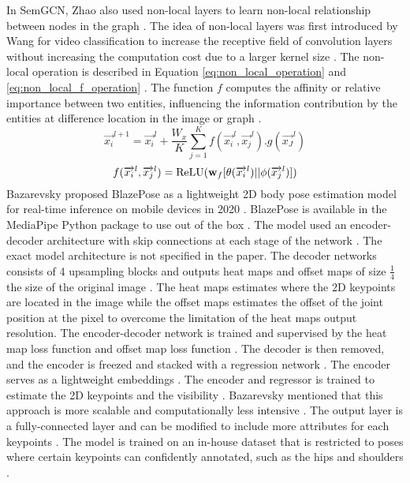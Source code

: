\noindent
In SemGCN, Zhao also used non-local layers to learn non-local relationship between nodes in the graph \cite{semgcn}. The idea of non-local layers was first introduced by Wang for video classification to increase the receptive field of convolution layers without increasing the computation cost due to a larger kernel size \cite{nonlocal}. The non-local operation is described in Equation \ref{eq:non_local_operation} and \ref{eq:non_local_f_operation} \cite{nonlocal}. The function \(f\) computes the affinity or relative importance between two entities, influencing the information contribution by the entities at difference location in the image or graph \cite{nonlocal}. 
\begin{equation}
\overrightarrow{x_i}^{l+1}=\overrightarrow{x_i}^{l}+\frac{W_x}{K}\sum_{j=1}^{K}f(\overrightarrow{x_i}^{l},\overrightarrow{x_j}^{l}).g(\overrightarrow{x_J}^{l}) \label{eq:non_local_operation}
\end{equation}
\begin{equation}
f(\overrightarrow{x_i}^{l},\overrightarrow{x_j}^{l})=\operatorname*{ReLU}(\mathbf{w}_f [\theta(\overrightarrow{x_i}^{l})||\phi(\overrightarrow{x_j}^{l})]) \label{eq:non_local_f_operation}
\end{equation}
\noindent
Bazarevsky proposed BlazePose as a lightweight 2D body pose estimation model for real-time inference on mobile devices in 2020 \cite{blazepose}. BlazePose is available in the MediaPipe Python package to use out of the box \cite{blazepose}. The model used an encoder-decoder architecture with skip connections at each stage of the network \cite{blazepose}. The exact model architecture is not specified in the paper. The decoder networks consists of 4 upsampling blocks and outputs heat maps and offset maps of size \(\frac{1}{4}\) the size of the original image \cite{blazepose}. The heat maps estimates where the 2D keypoints are located in the image while the offset maps estimates the offset of the joint position at the pixel to overcome the limitation of the heat maps output resolution. The encoder-decoder network is trained and supervised by the heat map loss function and offset map loss function \cite{blazepose}. The decoder is then removed, and the encoder is freezed and stacked with a regression network \cite{blazepose}. The encoder serves as a lightweight embeddings \cite{blazepose}. The encoder and regressor is trained to estimate the 2D keypoints and the visibility \cite{blazepose}. Bazarevsky mentioned that this approach is more scalable and computationally less intensive \cite{blazepose}. The output layer is a fully-connected layer and can be modified to include more attributes for each keypoints \cite{blazepose}. The model is trained on an in-house dataset that is restricted to poses where certain keypoints can confidently annotated, such as the hips and shoulders \cite{blazepose}.

